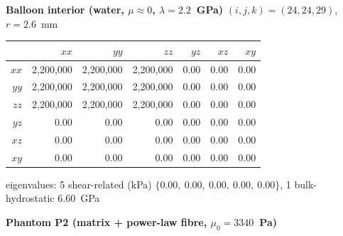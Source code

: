 \documentclass[11pt,letterpaper]{article}
\begin{document}
\textbf{Balloon interior (water, $\mu \approx 0$, $\lambda = 2.2$~GPa)} \quad $(i,j,k)=(24,24,29)$, $r=2.6$~mm
\begin{center}\scriptsize
\begin{tabular}{r|rrrrrr}
\toprule
 & $xx$ & $yy$ & $zz$ & $yz$ & $xz$ & $xy$ \\
\midrule
$xx$ & \phantom{$-$}2,200,000 & \phantom{$-$}2,200,000 & \phantom{$-$}2,200,000 & \phantom{$-$}0.00 & \phantom{$-$}0.00 & \phantom{$-$}0.00 \\
$yy$ & \phantom{$-$}2,200,000 & \phantom{$-$}2,200,000 & \phantom{$-$}2,200,000 & \phantom{$-$}0.00 & \phantom{$-$}0.00 & \phantom{$-$}0.00 \\
$zz$ & \phantom{$-$}2,200,000 & \phantom{$-$}2,200,000 & \phantom{$-$}2,200,000 & \phantom{$-$}0.00 & \phantom{$-$}0.00 & \phantom{$-$}0.00 \\
$yz$ & \phantom{$-$}0.00 & \phantom{$-$}0.00 & \phantom{$-$}0.00 & \phantom{$-$}0.00 & \phantom{$-$}0.00 & \phantom{$-$}0.00 \\
$xz$ & \phantom{$-$}0.00 & \phantom{$-$}0.00 & \phantom{$-$}0.00 & \phantom{$-$}0.00 & \phantom{$-$}0.00 & \phantom{$-$}0.00 \\
$xy$ & \phantom{$-$}0.00 & \phantom{$-$}0.00 & \phantom{$-$}0.00 & \phantom{$-$}0.00 & \phantom{$-$}0.00 & \phantom{$-$}0.00 \\
\bottomrule
\end{tabular}
\end{center}
\vspace{-4pt}\noindent\hspace{1em}\scriptsize eigenvalues: 5 shear-related (kPa) $\{0.00,\ 0.00,\ 0.00,\ 0.00,\ 0.00\}$, 1 bulk-hydrostatic $6.60$~GPa
\vspace{8pt}
\begin{center}\small
\textbf{Phantom P2 (matrix + power-law fibre, $\mu_0 = 3340$~Pa)}
\end{center}
\end{document}
